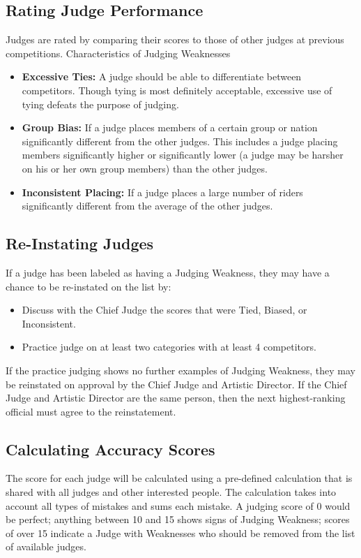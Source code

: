 \subsection{Rating Judge Performance  \label{subsec:freestyle_judging-panel_rating-judge-performance}}
Judges are rated by comparing their scores to those of other judges at previous competitions.
Characteristics of Judging Weaknesses
\begin{itemize}
\item \textbf{Excessive Ties:} A judge should be able to differentiate between competitors.
Though tying is most definitely acceptable, excessive use of tying defeats the purpose of judging.
\item \textbf{Group Bias:} If a judge places members of a certain group or nation significantly different from the other judges.
This includes a judge placing members significantly higher or significantly lower (a judge may be harsher on his or her own group members) than the other judges.
\item \textbf{Inconsistent Placing:} If a judge places a large number of riders significantly different from the average of the other judges.
\end{itemize}

\subsection{Re-Instating Judges}
If a judge has been labeled as having a Judging Weakness, they may have a chance to be re-instated on the list by:
\begin{itemize} 
\item Discuss with the Chief Judge the scores that were Tied, Biased, or Inconsistent.
\item Practice judge on at least two categories with at least 4 competitors.
\end{itemize}
If the practice judging shows no further examples of Judging Weakness, they may be reinstated on approval by the Chief Judge and Artistic Director.
If the Chief Judge and Artistic Director are the same person, then the next highest-ranking official must agree to the reinstatement.

\subsection{Calculating Accuracy Scores \label{subsec:freestyle_judging-panel_calculating-accuracy-scores}}
The score for each judge will be calculated using a pre-defined calculation that is shared with all judges and other interested people.
The calculation takes into account all types of mistakes and sums each mistake.
A judging score of 0 would be perfect; anything between 10 and 15 shows signs of Judging Weakness; scores of over 15 indicate a Judge with Weaknesses who should be removed from the list of available judges.

